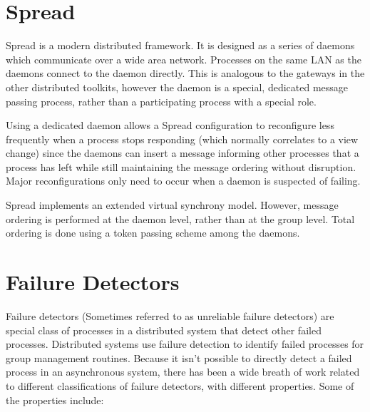 \section{Spread}

Spread\cite{SPREADTOOLKIT} is a modern distributed framework. It is designed as a series of daemons which communicate over a wide area network. Processes on the same LAN as the daemons connect to the daemon directly. This is analogous to the gateways in the other distributed toolkits, however the daemon is a special, dedicated message passing process, rather than a participating process with a special role.

Using a dedicated daemon allows a Spread configuration to reconfigure less frequently when a process stops responding (which normally correlates to a view change) since the daemons can insert a message informing other processes that a process has left while still maintaining the message ordering without disruption. Major reconfigurations only need to occur when a daemon is suspected of failing.

Spread implements an extended virtual synchrony model. However, message ordering is performed at the daemon level, rather than at the group level. Total ordering is done using a token passing scheme among the daemons.

\section{Failure Detectors}

Failure detectors \cite{FAILUREDETECTORS} (Sometimes referred to as unreliable failure detectors) are special class of processes in a distributed system that detect other failed processes. Distributed systems use failure detection to identify failed processes for group management routines. Because it isn't possible to directly detect a failed process in an asynchronous system, there has been a wide breath of work related to different classifications of failure detectors, with different properties. Some of the properties include\cite{FAILUREDETECTORS}:


